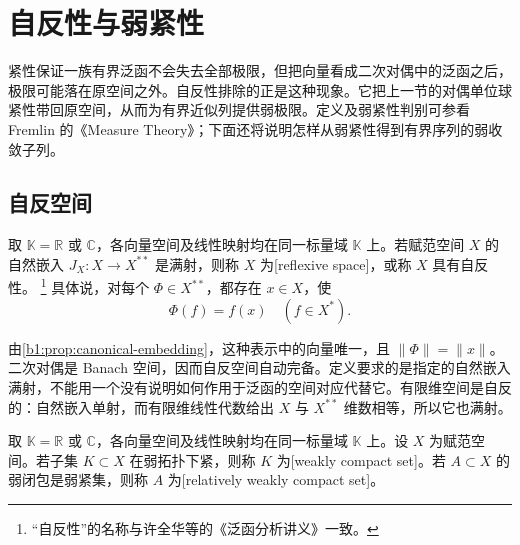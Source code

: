 \section{自反性与弱紧性}
\label{b1:sec:0904}

\WeakStar{}紧性保证一族有界泛函不会失去全部极限，但把向量看成二次对偶中的泛函之后，极限可能落在原空间之外。自反性排除的正是这种现象。它把上一节的对偶单位球紧性带回原空间，从而为有界近似列提供弱极限。定义及弱紧性判别可参看 Fremlin 的《Measure Theory》\cite[Volume 3, 3A5G]{Fremlin2016Measure}；下面还将说明怎样从弱紧性得到有界序列的弱收敛子列。


\subsection{自反空间}
\label{b1:subsec:090401}

\begin{definition}\label{b1:def:reflexive-space}
取 \(\mathbb K=\mathbb R\) 或 \(\mathbb C\)，各向量空间及线性映射均在同一标量域 \(\mathbb K\) 上。若赋范空间 \(X\) 的自然嵌入 \(J_X:X\rightarrow X^{**}\) 是满射，则称 \(X\) 为[reflexive space]，或称 \(X\) 具有自反性。%
\footnote{“自反性”的名称与许全华等的《泛函分析讲义》\cite[第9.3节]{Xu2017Fanhan}一致。}
具体说，对每个 \(\Phi\in X^{**}\)，都存在 \(x\in X\)，使
\[
 \Phi(f)=f(x)\quad(f\in X^*).
\]
\end{definition}

由\cref{b1:prop:canonical-embedding}，这种表示中的向量唯一，且 \(\|\Phi\|=\|x\|\)。二次对偶是 Banach 空间，因而自反空间自动完备。定义要求的是指定的自然嵌入满射，不能用一个没有说明如何作用于泛函的空间对应代替它。有限维空间是自反的：自然嵌入单射，而有限维线性代数给出 \(X\) 与 \(X^{**}\) 维数相等，所以它也满射。

\begin{definition}\label{b1:def:weakly-compact-set}
取 \(\mathbb K=\mathbb R\) 或 \(\mathbb C\)，各向量空间及线性映射均在同一标量域 \(\mathbb K\) 上。设 \(X\) 为赋范空间。若子集 \(K\subset X\) 在弱拓扑下紧，则称 \(K\) 为[weakly compact set]。若 \(A\subset X\) 的弱闭包是弱紧集，则称 \(A\) 为[relatively weakly compact set]。
\end{definition}


